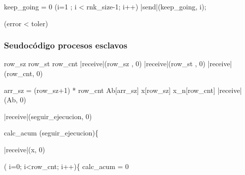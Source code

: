 \documentclass{article}
\begin{document}
\begin{program}
    keep\_going = 0
    \FOR (i=1 ; i < rnk\_size-1; i++)  
    |send|(keep\_going, i); 
\end{program}

\begin{program}
    \IF (error < toler)
    \ELSE
\end{program}


\subsubsection{Seudocódigo procesos esclavos}

\begin{program}
    row\_sz  
    row\_st  
    row\_cnt 
    |receive|(row\_sz , 0)
    |receive|(row\_st , 0) 
    |receive|(row\_cnt, 0)
\end{program}

\begin{program}
    arr\_sz = (row\_sz+1) * row\_cnt 
    Ab[arr\_sz] 
    x[row\_sz] 
    x\_n[row\_cnt]
    |receive|(Ab, 0) 
\end{program}

\begin{program}
    |receive|(seguir\_ejecucion, 0) 
\end{program}

\begin{program}
    calc\_acum 
    \WHILE (seguir\_ejecucion)\{
\end{program}

\begin{program}
    |receive|(x, 0) 
\end{program}

\begin{program}
    \FOR ( i=0; i<row\_cnt; i++)\{  
    calc\_acum = 0
\end{program}
\end{document}
